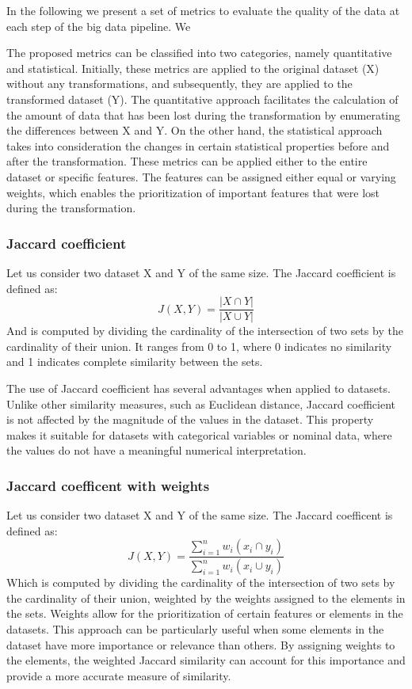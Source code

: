 In the following we present a set of metrics to evaluate the quality of the data at each step of the big data pipeline.
We

The proposed metrics can be classified into two categories, namely quantitative and statistical.
Initially, these metrics are applied to the original dataset (X) without any transformations, and subsequently, they are applied to the transformed dataset (Y).
The quantitative approach facilitates the calculation of the amount of data that has been lost during the transformation by enumerating the differences between X and Y.
On the other hand, the statistical approach takes into consideration the changes in certain statistical properties before and after the transformation.
These metrics can be applied either to the entire dataset or specific features.
The features can be assigned either equal or varying weights, which enables the prioritization of important features that were lost during the transformation.

\subsubsection{Jaccard coefficient}
Let us consider two dataset X and Y of the same size.
The Jaccard coefficient is defined as:\[J(X,Y) = \frac{|X \cap Y|}{|X \cup Y|}\]
And is computed by dividing the cardinality of the intersection of two sets by the cardinality of their union.
It ranges from 0 to 1, where 0 indicates no similarity and 1 indicates complete similarity between the sets.

The use of Jaccard coefficient has several advantages when applied to datasets.
Unlike other similarity measures, such as Euclidean distance, Jaccard coefficient is not affected by the magnitude of the values in the dataset.
This property makes it suitable for datasets with categorical variables or nominal data, where the values do not have a meaningful numerical interpretation.

\subsubsection{Jaccard coefficent with weights} Let us consider two dataset X and Y of the same size.
The Jaccard coefficent is defined as:\[J(X,Y) = \frac{\sum_{i=1}^{n}w_i(x_i \cap y_i)}{\sum_{i=1}^{n}w_i(x_i \cup y_i)}\]
Which is computed by dividing the cardinality of the intersection of two sets by the cardinality of their union, weighted by the weights assigned to the elements in the sets.
Weights allow for the prioritization of certain features or elements in the datasets.
This approach can be particularly useful when some elements in the dataset have more importance or relevance than others.
By assigning weights to the elements, the weighted Jaccard similarity can account for this importance and provide a more accurate measure of similarity.

